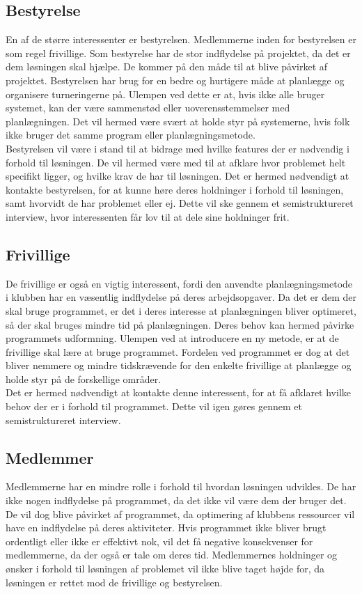 \subsection{Bestyrelse}
En af de større interessenter er bestyrelsen. Medlemmerne inden for bestyrelsen er som regel frivillige. Som bestyrelse har de stor indflydelse på projektet, da det er dem løsningen skal hjælpe. De kommer på den måde til at blive påvirket af projektet. Bestyrelsen har brug for en bedre og hurtigere måde at planlægge og organisere turneringerne på. Ulempen ved dette er at, hvis ikke alle bruger systemet, kan der være sammenstød eller uoverensstemmelser med planlægningen. Det vil hermed være svært at holde styr på systemerne, hvis folk ikke bruger det samme program eller planlægningsmetode.\\ 
Bestyrelsen vil være i stand til at bidrage med hvilke features der er nødvendig i forhold til løsningen. De vil hermed være med til at afklare hvor problemet helt specifikt ligger, og hvilke krav de har til løsningen. Det er hermed nødvendigt at kontakte bestyrelsen, for at kunne høre deres holdninger i forhold til løsningen, samt hvorvidt de har problemet eller ej. Dette vil ske gennem et semistruktureret interview, hvor interessenten får lov til at dele sine holdninger frit.

\subsection{Frivillige}
De frivillige er også en vigtig interessent, fordi den anvendte planlægningsmetode i klubben har en væsentlig indflydelse på deres arbejdsopgaver. Da det er dem der skal bruge programmet, er det i deres interesse at planlægningen bliver optimeret, så der skal bruges mindre tid på planlægningen. Deres behov kan hermed påvirke programmets udformning. Ulempen ved at introducere en ny metode, er at de frivillige skal lære at bruge programmet. Fordelen ved programmet er dog at det bliver nemmere og mindre tidskrævende for den enkelte frivillige at planlægge og holde styr på de forskellige områder. \\ Det er hermed nødvendigt at kontakte denne interessent, for at få afklaret hvilke behov der er i forhold til programmet. Dette vil igen gøres gennem et semistruktureret interview.

\subsection{Medlemmer}
Medlemmerne har en mindre rolle i forhold til hvordan løsningen udvikles. De har ikke nogen indflydelse på programmet, da det ikke vil være dem der bruger det. De vil dog blive påvirket af programmet, da optimering af klubbens ressourcer vil have en indflydelse på deres aktiviteter. Hvis programmet ikke bliver brugt ordentligt eller ikke er effektivt nok, vil det få negative konsekvenser for medlemmerne, da der også er tale om deres tid. Medlemmernes holdninger og ønsker i forhold til løsningen af problemet vil ikke blive taget højde for, da løsningen er rettet mod de frivillige og bestyrelsen.

